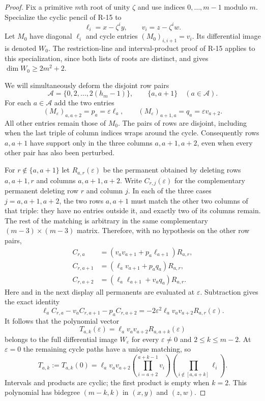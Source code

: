 \begin{proof}
Fix a primitive $m$th root of unity $\zeta$ and use indices
$0,\ldots,m-1$ modulo $m$. Specialize the cyclic pencil of
R-15 to
\[
 \ell_i=x-\zeta^i y,\qquad v_i=z-\zeta^i w.
\]
Let $M_0$ have diagonal $\ell_i$ and cycle entries
$(M_0)_{i,i+1}=v_i$. Its differential image is denoted $W_0$.
The restriction-line and interval-product proof of R-15 applies
to this specialization, since both lists of roots are distinct,
and gives $\dim W_0\geq2m^2+2$.

We will simultaneously deform the disjoint row pairs
\[
 \mathcal A=\{0,2,\ldots,2(h_m-1)\},\qquad
 \{a,a+1\}\quad(a\in\mathcal A).
\]
For each $a\in\mathcal A$ add the two entries
\begin{equation}\label{R16:simultaneouspencil}
 (M_\varepsilon)_{a,a+2}=p_a=\varepsilon\ell_a,
 \qquad
 (M_\varepsilon)_{a+1,a}=q_a=\varepsilon v_{a+2}.
\end{equation}
All other entries remain those of $M_0$. The pairs of rows are
disjoint, including when the last triple of column indices
wraps around the cycle. Consequently rows $a,a+1$ have support
only in the three columns $a,a+1,a+2$, even when every other
pair has also been perturbed.

For $r\notin\{a,a+1\}$ let $R_{a,r}(\varepsilon)$ be the
permanent obtained by deleting rows $a,a+1,r$ and columns
$a,a+1,a+2$. Write $C_{r,j}(\varepsilon)$ for the complementary
permanent deleting row $r$ and column $j$. In each of the
three cases $j=a,a+1,a+2$, the two rows $a,a+1$ must match
the other two columns of that triple: they have no entries
outside it, and exactly two of its columns remain. The rest
of the matching is arbitrary in the same complementary
$(m-3)\times(m-3)$ matrix. Therefore, with no hypothesis on
the other row pairs,
\[
 \begin{aligned}
 C_{r,a}&=(v_a v_{a+1}+p_a\ell_{a+1})R_{a,r},\\
 C_{r,a+1}&=(\ell_a v_{a+1}+p_aq_a)R_{a,r},\\
 C_{r,a+2}&=(\ell_a\ell_{a+1}+v_aq_a)R_{a,r}.
 \end{aligned}
\]
Here and in the next display all permanents are evaluated at
$\varepsilon$. Subtraction gives the exact identity
\begin{equation}\label{R16:simultaneousidentity}
 \ell_a C_{r,a}-v_a C_{r,a+1}-p_a C_{r,a+2}
   =-2\varepsilon^2\ell_a v_a v_{a+2}R_{a,r}(\varepsilon).
\end{equation}
It follows that the polynomial vector
\[
 T_{a,k}(\varepsilon)
   =\ell_a v_a v_{a+2}R_{a,a+k}(\varepsilon)
\]
belongs to the full differential image $W_\varepsilon$ for
every $\varepsilon\ne0$ and $2\leq k\leq m-2$.
At $\varepsilon=0$ the remaining cycle paths have a unique
matching, so
\begin{equation}\label{R16:normalvectors}
 T_{a,k}:=T_{a,k}(0)
 =\ell_a v_a v_{a+2}
   \left(\prod_{i=a+2}^{a+k-1}v_i\right)
   \left(\prod_{i\notin[a,a+k]}\ell_i\right).
\end{equation}
Intervals and products are cyclic; the first product is empty
when $k=2$. This polynomial has bidegree $(m-k,k)$ in
$(x,y)$ and $(z,w)$.


\end{proof}
